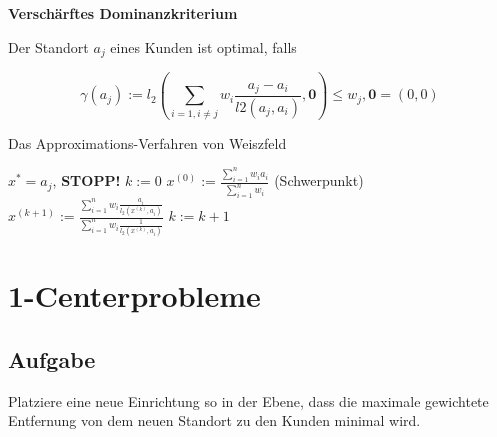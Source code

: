       \par \textbf{Verschärftes Dominanzkriterium}

      \par Der Standort $a_j$ eines Kunden ist optimal, falls

      \begin{equation}
        \gamma(a_j) := l_2(\sum_{i=1, i \neq j} w_i \frac{a_j - a_i}{l2(a_j, a_i)}, \mathbf{0}) \leq w_j, \mathbf{0} = (0, 0)
      \end{equation}


      \begin{algorithm}[htbp]
        \caption{Das Approximations-Verfahren von Weiszfeld}
        \begin{algorithmic}[1]
            \State $x^* = a_j$, \textbf{STOPP!}
          \Else
            \State $k:=0$
            \State $x^{(0)}:=\frac{\sum_{i=1}^{n}w_ia_i}{\sum_{i=1}^{n}w_i}$ (Schwerpunkt)
              \State $x^{(k+1)} := \frac{\sum_{i=1}^{n}w_i\frac{a_i}{l_2(x^{(k)}, a_i)}}{\sum_{i=1}^{n}w_i\frac{1}{l_2(x^{(k)}, a_i)}}$
              \State $k:=k+1$
            \EndWhile
          \EndIf
        \end{algorithmic}
      \end{algorithm}

          
  

  \section{1-Centerprobleme} %
  \label{sec:1_centerprobleme}

    \subsection{Aufgabe} %
    \label{sub:aufgabe}

      Platziere eine neue Einrichtung so in der Ebene, dass die maximale gewichtete Entfernung von dem neuen Standort zu den Kunden minimal wird.
    

